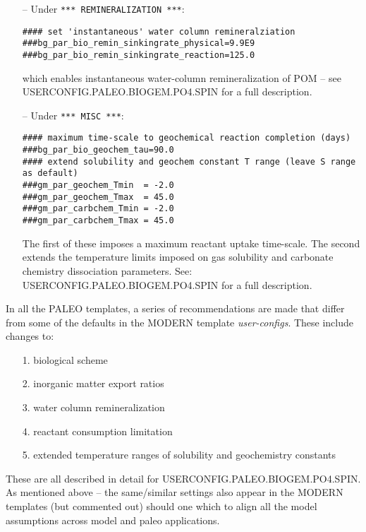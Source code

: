\begin{itemize}[leftmargin=0.6in]
\vspace{1mm}
\item[--] Under \texttt{*** REMINERALIZATION ***}:
\small\vspace{-1mm}\begin{verbatim}
#### set 'instantaneous' water column remineralziation
###bg_par_bio_remin_sinkingrate_physical=9.9E9
###bg_par_bio_remin_sinkingrate_reaction=125.0
\end{verbatim}\vspace{-1mm}\normalsize
which enables instantaneous water-column remineralization of POM -- see \linebreak \textsf{\footnotesize USERCONFIG.PALEO.BIOGEM.PO4.SPIN} for a full description.
\vspace{1mm}
\item[--] Under \texttt{*** MISC ***}:
\small\vspace{-1mm}\begin{verbatim}
#### maximum time-scale to geochemical reaction completion (days)
###bg_par_bio_geochem_tau=90.0
#### extend solubility and geochem constant T range (leave S range as default)
###gm_par_geochem_Tmin  = -2.0
###gm_par_geochem_Tmax  = 45.0
###gm_par_carbchem_Tmin = -2.0
###gm_par_carbchem_Tmax = 45.0
\end{verbatim}\vspace{-1mm}\normalsize
The first of these imposes a maximum reactant uptake time-scale. The second extends the temperature limits imposed on gas solubility and carbonate chemistry dissociation parameters. See: \textsf{\footnotesize USERCONFIG.PALEO.BIOGEM.PO4.SPIN} for a full description.
\end{itemize}

\vspace{1mm}
In  all the PALEO templates, a series of recommendations are made that differ from some of the defaults in the MODERN template \textit{user-configs}. These include changes to:
\begin{itemize}[leftmargin=0.6in]
\item[1.] biological scheme
\item[2.] inorganic matter export ratios
\item[3.] water column remineralization
\item[4.] reactant consumption limitation
\item[5.] extended temperature ranges of solubility and geochemistry constants
\end{itemize}
These are all described in detail for \textsf{\footnotesize USERCONFIG.PALEO.BIOGEM.PO4.SPIN}.
\\\noindent As mentioned above -- the same/similar settings also appear in the MODERN templates (but commented out) should one which to align all the model assumptions across model and paleo applications.

